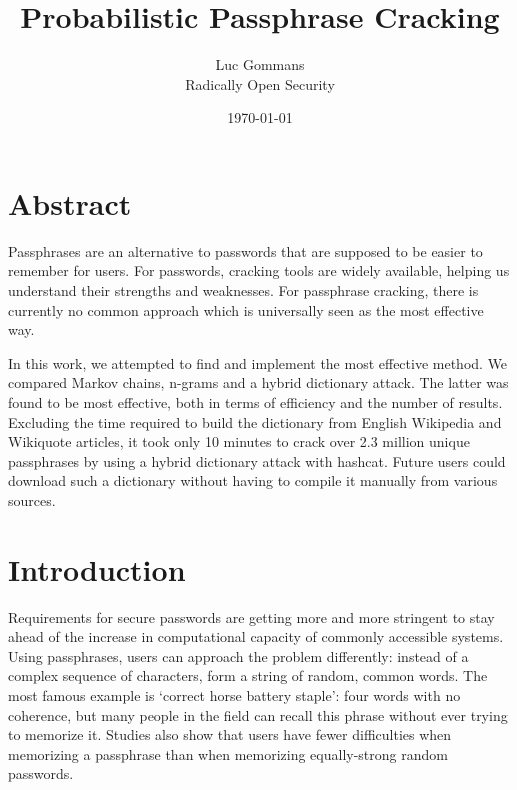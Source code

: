 \documentclass{article}
\begin{document}
\title{Probabilistic Passphrase Cracking}
\date{\today{}}
\author{Luc Gommans \\
	Radically Open Security
}

\maketitle

\section*{Abstract}

Passphrases are an alternative to passwords that are supposed to be easier to
remember for users. For passwords, cracking tools are widely available, helping
us understand their strengths and weaknesses. For passphrase cracking, there is
currently no common approach which is universally seen as the most effective
way.

In this work, we attempted to find and implement the most effective method. We
compared Markov chains, n-grams and a hybrid dictionary attack. The latter was
found to be most effective, both in terms of efficiency and the number of
results. Excluding the time required to build the dictionary from English
Wikipedia and Wikiquote articles, it took only 10 minutes to crack over 2.3
million unique passphrases by using a hybrid dictionary attack with hashcat.
Future users could download such a dictionary without having to compile it
manually from various sources.

\setlength{\parindent}{0pt}
\setlength{\parskip}{\baselineskip}

\newpage

\section{Introduction}

Requirements for secure passwords are getting more and more stringent to stay
ahead of the increase in computational capacity of commonly accessible systems.
Using passphrases, users can approach the problem differently: instead of a
complex sequence of characters, form a string of random, common words. The most
famous example is `correct horse battery staple': four words with no coherence,
but many people in the field can recall this phrase without ever trying to
memorize it\cite{own}. Studies also show that users have fewer difficulties
when memorizing a passphrase than when memorizing equally-strong random
passwords\cite{behavioral-analysis}\cite{pwd-memorability}.
\end{document}
